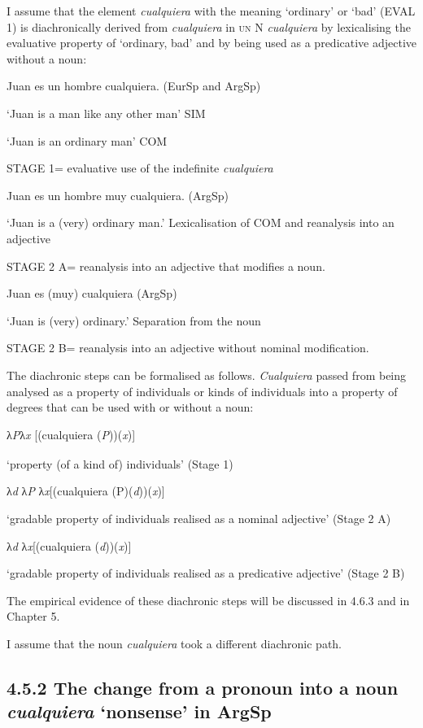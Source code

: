 I assume that the element \textit{cualquiera} with the meaning ‘ordinary’ or ‘bad’ (EVAL 1) is diachronically derived from \textit{cualquiera} in \textsc{un} N \textit{cualquiera} by lexicalising the evaluative property of ‘ordinary, bad’ and by being used as a predicative adjective without a noun:

    Juan es un hombre cualquiera. (EurSp and ArgSp)

‘Juan is a man like any other man’ SIM

‘Juan is an ordinary man’ COM

STAGE 1= evaluative use of the indefinite \textit{cualquiera} 

    Juan es un hombre muy cualquiera. (ArgSp)

‘Juan is a (very) ordinary man.’ Lexicalisation of COM and reanalysis into an adjective

STAGE 2 A= reanalysis into an adjective that modifies a noun.

    Juan es (muy) cualquiera (ArgSp) 

‘Juan is (very) ordinary.’ Separation from the noun

STAGE 2 B= reanalysis into an adjective without nominal modification.

The diachronic steps can be formalised as follows. \textit{Cualquiera} passed from being analysed as a property of individuals or kinds of individuals into a property of degrees that can be used with or without a noun:

     λ\textit{P}λ\textit{x\textsubscript{} }[(cualquiera (\textit{P}))(\textit{x})]  

‘property (of a kind of) individuals’    (Stage 1)

    λ\textit{d} λ\textit{P} λ\textit{x}[(cualquiera (P)(\textit{d}))(\textit{x})]

‘gradable property of individuals realised as a nominal adjective’  (Stage 2 A)

    λ\textit{d} λ\textit{x}[(cualquiera (\textit{d}))(\textit{x})]

‘gradable property of individuals realised as a predicative adjective’     (Stage 2 B)

The empirical evidence of these diachronic steps will be discussed in 4.6.3 and in Chapter 5.

I assume that the noun \textit{cualquiera} took a different diachronic path. 

\subsection{\textbf{4.5.2} \textbf{The} \textbf{change} \textbf{from} \textbf{a} \textbf{pronoun} \textbf{into} \textbf{a} \textbf{noun} \textbf{\textit{cualquiera}} \textbf{‘nonsense’} \textbf{in} \textbf{ArgSp}}

